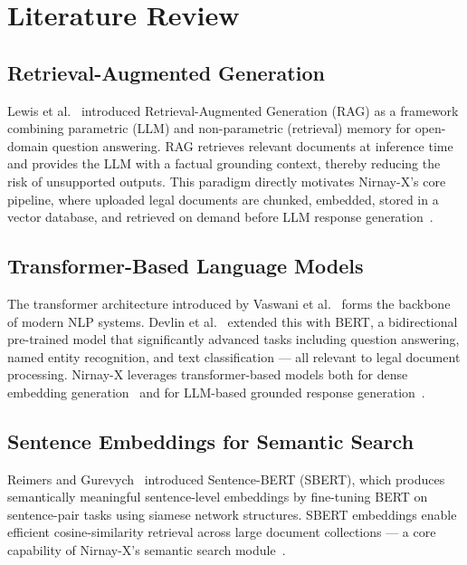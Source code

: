 \documentclass[12pt,a4paper]{article}
\begin{document}
\section{Literature Review}

\subsection{Retrieval-Augmented Generation}

Lewis et al.~\cite{lewis2020rag} introduced Retrieval-Augmented Generation (RAG) as
a framework combining parametric (LLM) and non-parametric (retrieval) memory for
open-domain question answering. RAG retrieves relevant documents at inference time and
provides the LLM with a factual grounding context, thereby reducing the risk of
unsupported outputs. This paradigm directly motivates Nirnay-X's core pipeline, where
uploaded legal documents are chunked, embedded, stored in a vector database, and
retrieved on demand before LLM response generation~\cite{lewis2020rag}.

\subsection{Transformer-Based Language Models}

The transformer architecture introduced by Vaswani et al.~\cite{vaswani2017attention}
forms the backbone of modern NLP systems. Devlin et al.~\cite{devlin2019bert} extended
this with BERT, a bidirectional pre-trained model that significantly advanced tasks
including question answering, named entity recognition, and text classification ---
all relevant to legal document processing. Nirnay-X leverages transformer-based
models both for dense embedding generation~\cite{reimers2019sbert} and for
LLM-based grounded response generation~\cite{vaswani2017attention}.

\subsection{Sentence Embeddings for Semantic Search}

Reimers and Gurevych~\cite{reimers2019sbert} introduced Sentence-BERT (SBERT), which
produces semantically meaningful sentence-level embeddings by fine-tuning BERT on
sentence-pair tasks using siamese network structures. SBERT embeddings enable efficient
cosine-similarity retrieval across large document collections --- a core capability of
Nirnay-X's semantic search module~\cite{reimers2019sbert, manning2008ir}.
\end{document}
